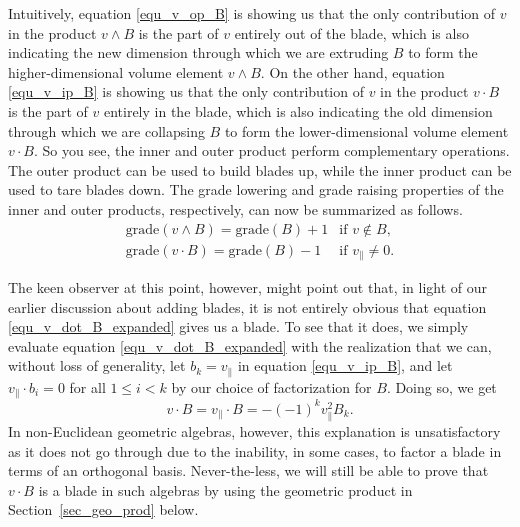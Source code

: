 \documentclass[12pt]{article}
\numberwithin{equation}{section}
\begin{document}

Intuitively, equation \eqref{equ_v_op_B} is showing us that
the only contribution of $v$ in the product $v\wedge B$
is the part of $v$ entirely out of the blade, which is also indicating
the new dimension through which we are extruding $B$ to
form the higher-dimensional volume element $v\wedge B$.
On the other hand, equation \eqref{equ_v_ip_B} is showing us
that the only contribution of $v$ in the product $v\cdot B$
is the part of $v$ entirely in the blade, which is also indicating
the old dimension through which we are collapsing $B$ to
form the lower-dimensional volume element $v\cdot B$.
So you see, the inner and outer product perform complementary
operations.  The outer product can be used to build blades up, while
the inner product can be used to tare blades down.
The grade lowering and grade raising properties of the inner
and outer products, respectively, can now be summarized
as follows.
\begin{equation}
\begin{array}{ll}
\mbox{grade}(v\wedge B) = \mbox{grade}(B)+1 & \mbox{if $v\not\in B$,} \\
\mbox{grade}(v\cdot B) = \mbox{grade}(B)-1 & \mbox{if $v_{\parallel}\neq 0$.}
\end{array}
\end{equation}

The keen observer at this point, however, might point
out that, in light of our earlier discussion
about adding blades, it is not entirely obvious that equation
\eqref{equ_v_dot_B_expanded} gives us a blade.  To see that
it does, we simply evaluate equation \eqref{equ_v_dot_B_expanded} with
the realization that we can, without loss of generality, let $b_k=v_{\parallel}$
in equation \eqref{equ_v_ip_B}, and let $v_{\parallel}\cdot b_i=0$ for all
$1\leq i<k$ by our choice of factorization for $B$.  Doing so, we get
\begin{equation}
v\cdot B = v_{\parallel}\cdot B = -(-1)^k v_{\parallel}^2 B_k.
\end{equation}
In non-Euclidean geometric algebras, however, this explanation is
unsatisfactory as it does not go through due to the inability, in some cases, to factor a blade in
terms of an orthogonal basis.  Never-the-less, we will still be able to prove that $v\cdot B$ is a
blade in such algebras by using the geometric product in Section~\ref{sec_geo_prod} below.
\end{document}
